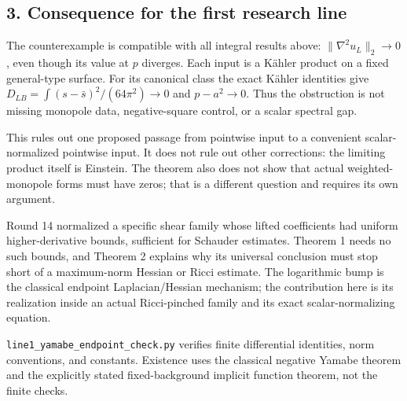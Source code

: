\documentclass[
  11pt,
]{article}
\begin{document}
\hypertarget{consequence-for-the-first-research-line}{%
\subsection{3. Consequence for the first research
line}\label{consequence-for-the-first-research-line}}

The counterexample is compatible with all integral results above:
\(\|\nabla^2u_L\|_2\to0\), even though its value at \(p\) diverges. Each
input is a Kähler product on a fixed general-type surface. For its
canonical class the exact Kähler identities give
\(D_{LB}=\int(s-\bar s)^2/(64\pi^2)\to0\) and \(p-a^2\to0\). Thus the
obstruction is not missing monopole data, negative-square control, or a
scalar spectral gap.

This rules out one proposed passage from pointwise input to a convenient
scalar-normalized pointwise input. It does not rule out other
corrections: the limiting product itself is Einstein. The theorem also
does not show that actual weighted-monopole forms must have zeros; that
is a different question and requires its own argument.

Round 14 normalized a specific shear family whose lifted coefficients
had uniform higher-derivative bounds, sufficient for Schauder estimates.
Theorem 1 needs no such bounds, and Theorem 2 explains why its universal
conclusion must stop short of a maximum-norm Hessian or Ricci estimate.
The logarithmic bump is the classical endpoint Laplacian/Hessian
mechanism; the contribution here is its realization inside an actual
Ricci-pinched family and its exact scalar-normalizing equation.

\texttt{line1\_yamabe\_endpoint\_check.py} verifies finite differential
identities, norm conventions, and constants. Existence uses the
classical negative Yamabe theorem and the explicitly stated
fixed-background implicit function theorem, not the finite checks.
\end{document}
